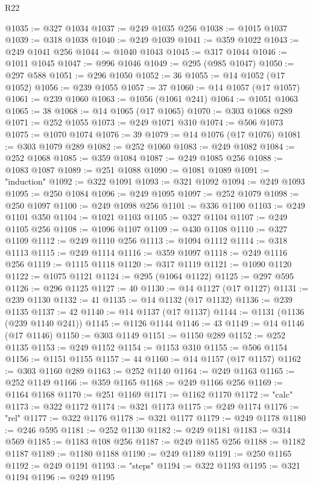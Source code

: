 \begin{lexlean}{R22}
\begin{coremodule}
@1035 := @327 @1034
@1037 := @249 @1035 @256
@1038 := @1015 @1037
@1039 := @318 @1038
@1040 := @249 @1039
@1041 := @359 @1022
@1043 := @249 @1041 @256
@1044 := @1040 @1043
@1045 := @317 @1044
@1046 := @1011 @1045
@1047 := @996 @1046
@1049 := @295 (@985 @1047)
@1050 := @297 @588
@1051 := @296 @1050
@1052 := 36
@1055 := @14 @1052 (@17 @1052)
@1056 := @239 @1055
@1057 := 37
@1060 := @14 @1057 (@17 @1057)
@1061 := @239 @1060
@1063 := @1056 (@1061 @241)
@1064 := @1051 @1063
@1065 := 38
@1068 := @14 @1065 (@17 @1065)
@1070 := @303 @1068 @289
@1071 := @252 @1055
@1073 := @249 @1071 @310
@1074 := @506 @1073
@1075 := @1070 @1074
@1076 := 39
@1079 := @14 @1076 (@17 @1076)
@1081 := @303 @1079 @289
@1082 := @252 @1060
@1083 := @249 @1082
@1084 := @252 @1068
@1085 := @359 @1084
@1087 := @249 @1085 @256
@1088 := @1083 @1087
@1089 := @251 @1088
@1090 := @1081 @1089
@1091 := "induction"
@1092 := @322 @1091
@1093 := @321 @1092
@1094 := @249 @1093
@1095 := @250 @1084
@1096 := @249 @1095
@1097 := @252 @1079
@1098 := @250 @1097
@1100 := @249 @1098 @256
@1101 := @336 @1100
@1103 := @249 @1101 @350
@1104 := @1021 @1103
@1105 := @327 @1104
@1107 := @249 @1105 @256
@1108 := @1096 @1107
@1109 := @430 @1108
@1110 := @327 @1109
@1112 := @249 @1110 @256
@1113 := @1094 @1112
@1114 := @318 @1113
@1115 := @249 @1114
@1116 := @359 @1097
@1118 := @249 @1116 @256
@1119 := @1115 @1118
@1120 := @317 @1119
@1121 := @1090 @1120
@1122 := @1075 @1121
@1124 := @295 (@1064 @1122)
@1125 := @297 @595
@1126 := @296 @1125
@1127 := 40
@1130 := @14 @1127 (@17 @1127)
@1131 := @239 @1130
@1132 := 41
@1135 := @14 @1132 (@17 @1132)
@1136 := @239 @1135
@1137 := 42
@1140 := @14 @1137 (@17 @1137)
@1144 := @1131 (@1136 (@239 @1140 @241))
@1145 := @1126 @1144
@1146 := 43
@1149 := @14 @1146 (@17 @1146)
@1150 := @303 @1149
@1151 := @1150 @289
@1152 := @252 @1135
@1153 := @249 @1152
@1154 := @1153 @310
@1155 := @506 @1154
@1156 := @1151 @1155
@1157 := 44
@1160 := @14 @1157 (@17 @1157)
@1162 := @303 @1160 @289
@1163 := @252 @1140
@1164 := @249 @1163
@1165 := @252 @1149
@1166 := @359 @1165
@1168 := @249 @1166 @256
@1169 := @1164 @1168
@1170 := @251 @1169
@1171 := @1162 @1170
@1172 := "calc"
@1173 := @322 @1172
@1174 := @321 @1173
@1175 := @249 @1174
@1176 := "rel"
@1177 := @322 @1176
@1178 := @321 @1177
@1179 := @249 @1178
@1180 := @246 @595
@1181 := @252 @1130
@1182 := @249 @1181
@1183 := @314 @569
@1185 := @1183 @108 @256
@1187 := @249 @1185 @256
@1188 := @1182 @1187
@1189 := @1180 @1188
@1190 := @249 @1189
@1191 := @250 @1165
@1192 := @249 @1191
@1193 := "steps"
@1194 := @322 @1193
@1195 := @321 @1194
@1196 := @249 @1195

\end{coremodule}
\end{lexlean}
